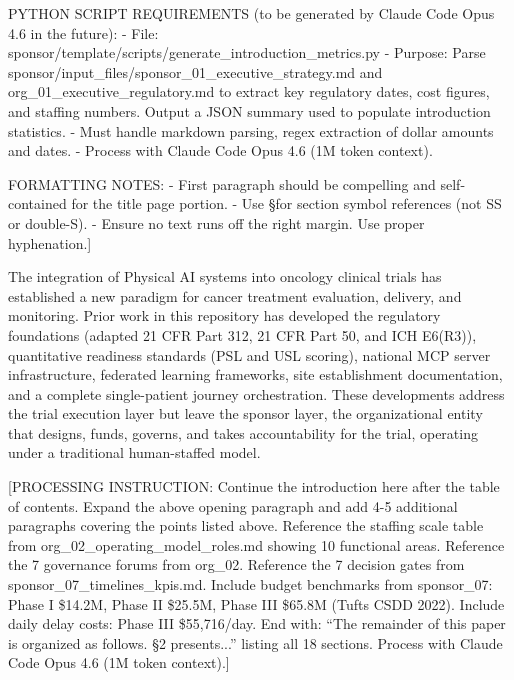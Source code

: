 PYTHON SCRIPT REQUIREMENTS (to be generated by Claude Code Opus 4.6 in the future):
- File: sponsor/template/scripts/generate\_introduction\_metrics.py
- Purpose: Parse sponsor/input\_files/sponsor\_01\_executive\_strategy.md and
  org\_01\_executive\_regulatory.md to extract key regulatory dates, cost figures,
  and staffing numbers. Output a JSON summary used to populate introduction statistics.
- Must handle markdown parsing, regex extraction of dollar amounts and dates.
- Process with Claude Code Opus 4.6 (1M token context).

FORMATTING NOTES:
- First paragraph should be compelling and self-contained for the title page portion.
- Use \S for section symbol references (not SS or double-S).
- Ensure no text runs off the right margin. Use proper hyphenation.]

The integration of Physical AI systems into oncology clinical trials has established a new
paradigm for cancer treatment evaluation, delivery, and monitoring. Prior work in this
repository has developed the regulatory foundations (adapted 21 CFR Part 312, 21 CFR Part 50,
and ICH E6(R3)), quantitative readiness standards (PSL and USL scoring), national MCP server
infrastructure, federated learning frameworks, site establishment documentation, and a
complete single-patient journey orchestration. These developments address the trial execution
layer but leave the sponsor layer, the organizational entity that designs, funds, governs,
and takes accountability for the trial, operating under a traditional human-staffed model.

[PROCESSING INSTRUCTION: Continue the introduction here after the table of contents. Expand
the above opening paragraph and add 4-5 additional paragraphs covering the points listed above.
Reference the staffing scale table from org\_02\_operating\_model\_roles.md showing 10 functional
areas. Reference the 7 governance forums from org\_02. Reference the 7 decision gates from
sponsor\_07\_timelines\_kpis.md. Include budget benchmarks from sponsor\_07: Phase I \$14.2M,
Phase II \$25.5M, Phase III \$65.8M (Tufts CSDD 2022). Include daily delay costs: Phase III
\$55,716/day. End with: ``The remainder of this paper is organized as follows. \S 2 presents...''
listing all 18 sections. Process with Claude Code Opus 4.6 (1M token context).]
